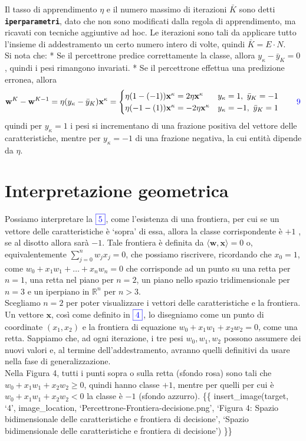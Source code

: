 \documentclass[
  letterpaper,
  DIV=11,
  numbers=noendperiod]{scrreprt}
\begin{document}
Il tasso di apprendimento \(\eta\) e il numero massimo di iterazioni
\(\bar{K}\) sono detti \textbf{\texttt{iperparametri}}, dato che non
sono modificati dalla regola di apprendimento, ma ricavati con tecniche
aggiuntive ad hoc. Le iterazioni sono tali da applicare tutto l'insieme
di addestramento un certo numero intero di volte, quindi
\(\bar{K}=E\cdot N\).\\
Si nota che: * Se il percettrone predice correttamente la classe, allora
\(y_\kappa-\bar{y}_K=0\), quindi i pesi rimangono invariati. * Se il
percettrone effettua una predizione erronea, allora \[
\mathbf{w}^K-\mathbf{w}^{K-1}=\eta (y_\kappa-\bar{y}_K)\mathbf{x}^\kappa=\begin{cases}\eta (1-(-1))\mathbf{x}^\kappa=2\eta \mathbf{x}^\kappa & y_\kappa=1,\ \bar{y}_K=-1 \\ \eta (-1-(1))\mathbf{x}^\kappa=-2\eta \mathbf{x}^\kappa & y_\kappa=-1,\ \bar{y}_K=1 \end{cases}\tag*{\color{blue}{9}}
\] quindi per \(y_\kappa=1\) i pesi si incrementano di una frazione
positiva del vettore delle caratteristiche, mentre per \(y_\kappa=-1\)
di una frazione negativa, la cui entità dipende da \(\eta\).

\section{Interpretazione geometrica}\label{interpretazione-geometrica}

Possiamo interpretare la \(\color{blue}\fbox{5}\), come l'esistenza di
una frontiera, per cui se un vettore delle caratteristiche è `sopra' di
essa, allora la classe corrispondente è \(+1\) , se al disotto allora
sarà \(-1\). Tale frontiera è definita da
\(\langle\mathbf{w},\mathbf{x}\rangle=0\) o, equivalentemente
\(\sum_{j=0}^{n} w_j x_j=0\), che possiamo riscrivere, ricordando che
\(x_0=1\), come \(w_0+x_1w_1+\dots+x_nw_n=0\) che corrisponde ad un
punto su una retta per \(n=1\), una retta nel piano per \(n=2\), un
piano nello spazio tridimensionale per \(n=3\) e un iperpiano in
\(\mathbb{R}^n\) per \(n>3\).\\
Scegliamo \(n=2\) per poter visualizzare i vettori delle caratteristiche
e la frontiera. Un vettore \(\mathbf{x}\), così come definito in
\(\color{blue}\fbox{4}\), lo disegniamo come un punto di coordinate
\((x_1,x_2)\) e la frontiera di equazione \(w_0+x_1w_1+x_2w_2=0\), come
una retta. Sappiamo che, ad ogni iterazione, i tre pesi \(w_0,w_1,w_2\)
possono assumere dei nuovi valori e, al termine dell'addestramento,
avranno quelli definitivi da usare nella fase di generalizzazione.\\
Nella Figura 4, tutti i punti sopra o sulla retta (sfondo rosa) sono
tali che \(w_0+x_1w_1+x_2w_2≥0\), quindi hanno classe \(+1\), mentre per
quelli per cui è \(w_0+x_1w_1+x_2w_2<0\) la classe è \(-1\) (sfondo
azzurro). \{\{ insert\_image(target, `4', image\_location,
`Percettrone-Frontiera-decisione.png', `Figura 4: Spazio bidimensionale
delle caratteristiche e frontiera di decisione', `Spazio bidimensionale
delle caratteristiche e frontiera di decisione') \}\}
\end{document}
